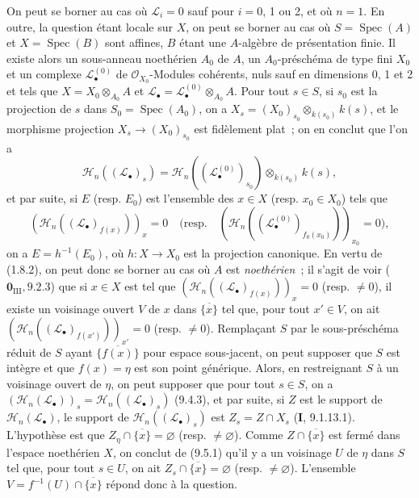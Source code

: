 On peut se borner au cas où $\mathcal L_i=0$ sauf pour $i=0$, 1 ou 2, et où
$n=1$. En outre, la question étant locale sur $X$, on peut se borner au cas où
$S=\operatorname{Spec}(A)$ et $X=\operatorname{Spec}(B)$ sont affines, $B$
étant une $A$-algèbre de présentation finie. Il existe alors un sous-anneau
noethérien $A_0$ de $A$, un $A_0$-préschéma de type fini $X_0$ et un complexe
$\mathcal L_\bullet^{(0)}$ de $\mathcal O_{X_0}$-Modules cohérents, nuls sauf en
dimensions 0, 1 et 2 et tels que
$X=X_0\otimes_{A_0}A$ et
$\mathcal L_\bullet=\mathcal L_\bullet^{(0)}\otimes_{A_0}A$. Pour tout
$s\in S$, si $s_0$ est la projection de $s$ dans
$S_0=\operatorname{Spec}(A_0)$, on a
$X_s=(X_0)_{s_0}\otimes_{k(s_0)}k(s)$, et le morphisme projection
$X_s\to(X_0)_{s_0}$ est fidèlement plat~; on en conclut que l'on a
\[
\mathcal H_n((\mathcal L_\bullet)_s)=
\mathcal H_n((\mathcal L_\bullet^{(0)})_{s_0})
\otimes_{k(s_0)}k(s),
\]
et par suite, si $E$ (resp. $E_0$) est l'ensemble des $x\in X$ (resp.
$x_0\in X_0$) tels que
\[
(\mathcal H_n((\mathcal L_\bullet)_{f(x)}))_x=0
\quad\text{(resp.}\quad
(\mathcal H_n((\mathcal L_\bullet^{(0)})_{f_0(x_0)}))_{x_0}=0\text{)},
\]
on a $E=h^{-1}(E_0)$, où $h:X\to X_0$ est la projection canonique. En vertu
de (1.8.2), on peut donc se borner au cas où $A$ est \emph{noethérien}~; il
s'agit de voir ($\mathbf 0_{\mathrm{III}},9.2.3$) que si $x\in X$ est tel que
$(\mathcal H_n((\mathcal L_\bullet)_{f(x)}))_x=0$ (resp. $\neq0$), il existe un
voisinage ouvert $V$ de $x$ dans $\overline{\{x\}}$ tel que, pour tout
$x'\in V$, on ait
$(\mathcal H_n((\mathcal L_\bullet)_{f(x')}))_{x'}=0$ (resp. $\neq0$).
Remplaçant $S$ par le sous-préschéma réduit de $S$ ayant
$\overline{\{f(x)\}}$ pour espace sous-jacent, on peut supposer que $S$ est
intègre et que $f(x)=\eta$ est son point générique. Alors, en restreignant $S$
à un voisinage ouvert de $\eta$, on peut supposer que pour tout $s\in S$, on a
$(\mathcal H_n(\mathcal L_\bullet))_s=
\mathcal H_n((\mathcal L_\bullet)_s)$ (9.4.3), et par suite, si $Z$ est le
support de $\mathcal H_n(\mathcal L_\bullet)$, le support de
$\mathcal H_n((\mathcal L_\bullet)_s)$ est $Z_s=Z\cap X_s$
(\textbf{I}, 9.1.13.1). L'hypothèse est que
$Z_\eta\cap\overline{\{x\}}=\varnothing$ (resp. $\neq\varnothing$). Comme
$Z\cap\overline{\{x\}}$ est fermé dans l'espace noethérien $X$, on conclut de
(9.5.1) qu'il y a un voisinage $U$ de $\eta$ dans $S$ tel que, pour tout
$s\in U$, on ait $Z_s\cap\overline{\{x\}}=\varnothing$ (resp.
$\neq\varnothing$). L'ensemble $V=f^{-1}(U)\cap\overline{\{x\}}$ répond donc à
la question.
